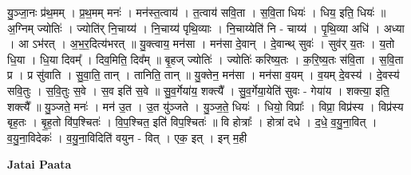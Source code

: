 \documentclass[17pt]{extarticle}
\begin{document}
यु॒ञ्जा॒नः प्र॑थ॒मम् । प्र॒थ॒मम् मनः॑ । मन॑स्त॒त्वाय॑ । त॒त्वाय॑ सवि॒ता । स॒वि॒ता धियः॑ । धिय॒ इति॒ धियः॑ ॥ अ॒ग्निम् ज्योतिः॑ । ज्योति॑र् नि॒चाय्य॑ । नि॒चाय्य॑ पृथि॒व्याः । नि॒चाय्येति॑ नि - चाय्य॑ । पृ॒थि॒व्या अधि॑ । अध्या । आ ऽभ॑रत् । अ॒भ॒र॒दित्य॑भरत् ॥ 
यु॒क्त्वाय॒ मन॑सा । मन॑सा दे॒वान् । दे॒वान्थ् सुवः॑ । सुव॑र् य॒तः । य॒तो धि॒या । धि॒या दिवम्᳚ । दिव॒मिति॒ दिव᳚म् ॥ बृ॒हज् ज्योतिः॑ । ज्योतिः॑ करिष्य॒तः । क॒रि॒ष्य॒तः स॑वि॒ता । स॒वि॒ता प्र । प्र सु॑वाति । सु॒वा॒ति॒ तान् । तानिति॒ तान् ॥ यु॒क्तेन॒ मन॑सा । मन॑सा व॒यम् । 
व॒यम् दे॒वस्य॑ । दे॒वस्य॑ सवि॒तुः । स॒वि॒तुः स॒वे । स॒व इति॑ स॒वे ॥ सु॒व॒र्गेया॑य॒ शक्त्यै᳚ । सु॒व॒र्गेया॒येति॑ सुवः - गेया॑य । शक्त्या॒ इति॒ शक्त्यै᳚ ॥ यु॒ञ्जते॒ मनः॑ । मन॑ उ॒त । उ॒त यु॑ञ्जते । यु॒ञ्ज॒ते॒ धियः॑ । धियो॒ विप्राः᳚ । विप्रा॒ विप्र॑स्य । विप्र॑स्य बृह॒तः । बृ॒ह॒तो वि॑प॒श्चितः॑ । वि॒प॒श्चित॒ इति॑ विप॒श्चितः॑ ॥ वि होत्राः᳚ । होत्रा॑ दधे । द॒धे॒ व॒यु॒ना॒वित् । व॒यु॒ना॒विदेकः॑ । व॒यु॒ना॒विदिति॑ वयुन - वित् । एक॒ इत् । इन् म॒ही \newline

\textbf{Jatai Paata} \newline
\end{document}
